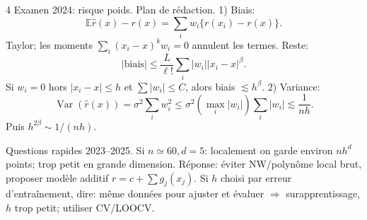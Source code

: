 \documentclass[10pt]{article}
\newcommand{\E}{\mathbb E}
\newcommand{\V}{\operatorname{Var}}
\newcommand{\tinytitle}[1]{#1.}
\begin{document}
\begin{multicols*}{4}
\tinytitle{Examen 2024: risque poids}
Plan de rédaction. 1) Biais:
\[
\E\widehat r(x)-r(x)=\sum_iw_i\{r(x_i)-r(x)\}.
\]
Taylor; les moments \(\sum_i(x_i-x)^kw_i=0\) annulent les termes. Reste:
\[
|\mathrm{biais}|\le \frac{L}{\ell!}\sum_i|w_i||x_i-x|^\beta.
\]
Si \(w_i=0\) hors \(|x_i-x|\le h\) et \(\sum|w_i|\le C\), alors biais \(\lesssim h^\beta\).
2) Variance:
\[
\V(\widehat r(x))=\sigma^2\sum_iw_i^2
\le \sigma^2(\max_i|w_i|)\sum_i|w_i|
\lesssim \frac1{nh}.
\]
Puis \(h^{2\beta}\sim1/(nh)\).

\tinytitle{Questions rapides 2023--2025}
Si \(n\simeq60,d=5\): localement on garde environ \(nh^d\) points; trop petit en grande dimension. Réponse: éviter NW/polynôme local brut, proposer modèle additif \(r=c+\sum g_j(x_j)\). Si \(h\) choisi par erreur d'entraînement, dire: même données pour ajuster et évaluer \(\Rightarrow\) surapprentissage, \(h\) trop petit; utiliser CV/LOOCV.

\end{multicols*}
\end{document}
